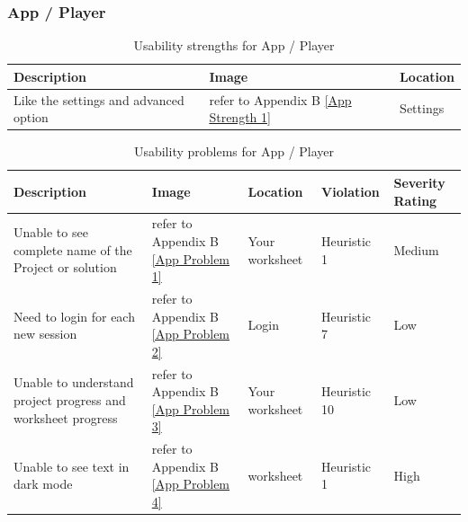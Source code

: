 \documentclass[conference,onecolumn]{IEEEtran}
\begin{document}
        \subsubsection{App / Player} \hfill
            \begin{table}[H]	
                \begin{center}
                    \begin{tabular}[H]{ |m{8cm}|m{5cm}|m{4cm}|}
                        \hline
                        \textbf{Description}&\textbf{Image} &\textbf{Location}  \\ \hline
                        Like the settings and advanced option 	&refer to Appendix B \figurename{\ref{App Strength 1}} &Settings  \\ 
                        \hline
                    \end{tabular}
                \end{center}
                \caption{Usability strengths for App / Player}
                \label{Usability strengths for App/Player}
            \end{table}

            \begin{table}[H]	
                \begin{center}
                    \begin{tabular}[H]{ |m{7cm}|m{3cm}|m{2cm}|m{2cm}|m{2cm}|}
                        \hline
                        \textbf{Description}&\textbf{Image} &\textbf{Location} &\textbf{Violation} &\textbf{Severity Rating}  \\ \hline
                        Unable to see complete name of the Project or solution 	        &refer to Appendix B \figurename{\ref{App Problem 1}}  &Your worksheet &Heuristic 1 &Medium  \\ \hline
                        Need to login for each new session 	                            &refer to Appendix B \figurename{\ref{App Problem 2}}  &Login &Heuristic 7 &Low  \\ \hline
                        Unable to understand project progress and worksheet progress 	&refer to Appendix B \figurename{\ref{App Problem 3}}  &Your worksheet &Heuristic 10 &Low  \\ \hline
                        Unable to see text in dark mode 	                            &refer to Appendix B \figurename{\ref{App Problem 4}} &worksheet &Heuristic 1 &High   \\ 
                        \hline
                    \end{tabular}
                \end{center}
                \caption{Usability problems for App / Player}
                \label{Usability problems for App/Player}
            \end{table}
\end{document}
